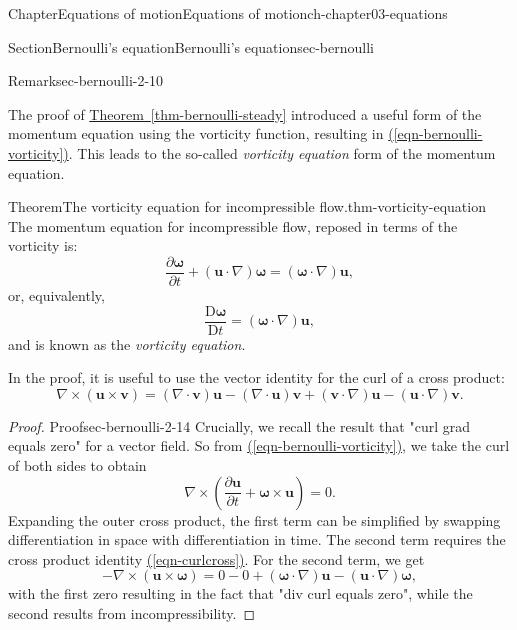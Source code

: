 \documentclass[oneside,10pt,]{book}
\newcommand{\xreffont}{\relax}
\numberwithin{equation}{section}
\newcommand{\DD}[2]{\frac{\mathrm{D}#1}{\mathrm{D}#2}}
\newcommand{\pd}[2]{\frac{\partial#1}{\partial#2}}
\newcommand{\bu}{\boldsymbol{u}}
\newcommand{\bv}{\boldsymbol{v}}
\newcommand{\bomega}{\boldsymbol{\omega}}
\begin{document}
\begin{chapterptx}{Chapter}{Equations of motion}{}{Equations of motion}{}{}{ch-chapter03-equations}
\begin{sectionptx}{Section}{Bernoulli's equation}{}{Bernoulli's equation}{}{}{sec-bernoulli}
\begin{introduction}{}
\begin{remark}{Remark}{}{sec-bernoulli-2-10}
\end{remark}
The proof of \hyperref[thm-bernoulli-steady]{Theorem~{\xreffont\ref{thm-bernoulli-steady}}} introduced a useful form of the momentum equation using the vorticity function, resulting in \hyperref[eqn-bernoulli-vorticity]{({\xreffont\ref{eqn-bernoulli-vorticity}})}. This leads to the so-called \emph{vorticity equation} form of the momentum equation.%
\begin{theorem}{Theorem}{The vorticity equation for incompressible flow.}{}{thm-vorticity-equation}%
The momentum equation for incompressible flow, reposed in terms of the vorticity is:%
\begin{equation}
\pd{\bomega}{t} + (\bu \cdot \nabla)\bomega = (\bomega \cdot \nabla)\bu,\label{eqn-vorticity-equation}
\end{equation}
or, equivalently,%
\begin{equation}
\DD{\bomega}{t} = (\bomega \cdot \nabla)\bu,\label{eqn-vorticity-equation-lagrange}
\end{equation}
and is known as the \emph{vorticity equation}.%
\end{theorem}
In the proof, it is useful to use the vector identity for the curl of a cross product:%
\begin{equation}
\nabla \times (\bu \times \bv) = (\nabla \cdot \bv)\bu - (\nabla \cdot \bu)\bv + (\bv \cdot \nabla)\bu - (\bu \cdot \nabla)\bv.  \label{eqn-curlcross}
\end{equation}
%
\begin{proof}{Proof}{}{sec-bernoulli-2-14}
Crucially, we recall the result that "curl grad equals zero" for a vector field. So from \hyperref[eqn-bernoulli-vorticity]{({\xreffont\ref{eqn-bernoulli-vorticity}})}, we take the curl of both sides to obtain%
\begin{equation*}
\nabla \times \left(\pd{\bu}{t} + \bomega \times \bu\right) = 0.
\end{equation*}
Expanding the outer cross product, the first term can be simplified by swapping differentiation in space with differentiation in time. The second term requires the cross product identity \hyperref[eqn-curlcross]{({\xreffont\ref{eqn-curlcross}})}. For the second term, we get%
\begin{equation*}
-\nabla \times (\bu \times \bomega) = 0 - 0 + (\bomega \cdot \nabla)\bu - (\bu \cdot \nabla)\bomega,
\end{equation*}
with the first zero resulting in the fact that "div curl equals zero", while the second results from incompressibility.%

\end{proof}
\end{introduction}
\end{sectionptx}
\end{chapterptx}
\end{document}
